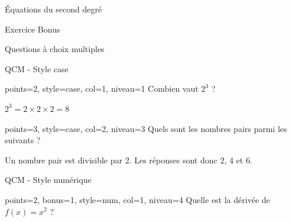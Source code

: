\documentclass[theme=vert]{nfdevoirs}
\begin{document}
\begin{devoir}
\begin{partie}{Équations du second degré}
\begin{exercice}{Exercice Bonus}
        \end{exercice}

    \end{partie}

    \begin{partie}{Questions à choix multiples}

        \begin{exercice}{QCM - Style case}

            \begin{qcm}{points=2, style=case, col=1, niveau=1}
                Combien vaut $2^3$ ?
                \begin{choix}
                \end{choix}
            \end{qcm}

            \begin{correction}
                $2^3 = 2 \times 2 \times 2 = 8$
            \end{correction}

            \begin{qcm}{points=3, style=case, col=2, niveau=3}
                Quels sont les nombres pairs parmi les suivants ?
                \begin{choix}
                \end{choix}
            \end{qcm}

            \begin{correction}
                Un nombre pair est divisible par 2. Les réponses sont donc 2, 4 et 6.
            \end{correction}

        \end{exercice}

        \begin{exercice}{QCM - Style numérique}

            \begin{qcm}{points=2, bonus=1, style=num, col=1, niveau=4}
                Quelle est la dérivée de $f(x) = x^2$ ?
                \begin{choix}
                \end{choix}
            \end{qcm}


\end{exercice}
\end{partie}
\end{devoir}
\end{document}
